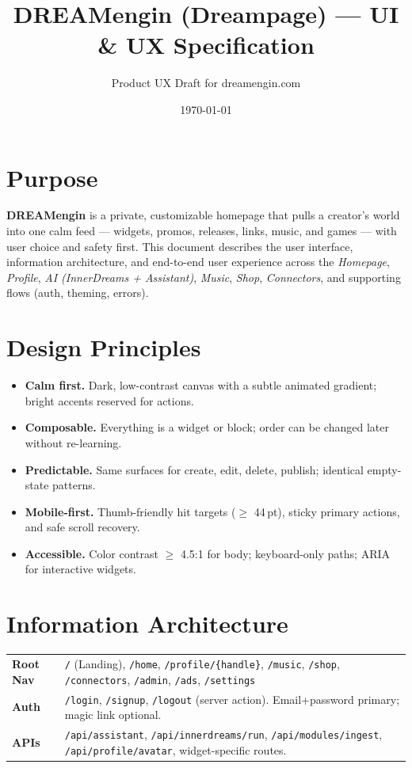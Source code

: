 \documentclass[11pt]{article}
\title{DREAMengin (Dreampage) --- UI \& UX Specification}
\author{Product UX Draft for dreamengin.com}
\date{\today}
\begin{document}
\maketitle

\section{Purpose}
\textbf{DREAMengin} is a private, customizable homepage that pulls a creator's world into one calm feed --- widgets, promos, releases, links, music, and games --- with user choice and safety first. This document describes the user interface, information architecture, and end-to-end user experience across the \emph{Homepage}, \emph{Profile}, \emph{AI (InnerDreams + Assistant)}, \emph{Music}, \emph{Shop}, \emph{Connectors}, and supporting flows (auth, theming, errors).

\section{Design Principles}
\begin{itemize}
  \item \textbf{Calm first.} Dark, low-contrast canvas with a subtle animated gradient; bright accents reserved for actions.
  \item \textbf{Composable.} Everything is a widget or block; order can be changed later without re-learning.
  \item \textbf{Predictable.} Same surfaces for create, edit, delete, publish; identical empty-state patterns.
  \item \textbf{Mobile-first.} Thumb-friendly hit targets ($\geq$ 44\,pt), sticky primary actions, and safe scroll recovery.
  \item \textbf{Accessible.} Color contrast $\geq$ 4.5:1 for body; keyboard-only paths; ARIA for interactive widgets.
\end{itemize}

\section{Information Architecture}
\begin{longtable}{>{\bfseries}p{3.2cm}p{11cm}}
Root Nav & \texttt{/} (Landing), \texttt{/home}, \texttt{/profile/\{handle\}}, \texttt{/music}, \texttt{/shop}, \texttt{/connectors}, \texttt{/admin}, \texttt{/ads}, \texttt{/settings} \\
Auth & \texttt{/login}, \texttt{/signup}, \texttt{/logout} (server action). Email+password primary; magic link optional. \\
APIs & \texttt{/api/assistant}, \texttt{/api/innerdreams/run}, \texttt{/api/modules/ingest}, \texttt{/api/profile/avatar}, widget-specific routes. \\
\end{longtable}
\end{document}
